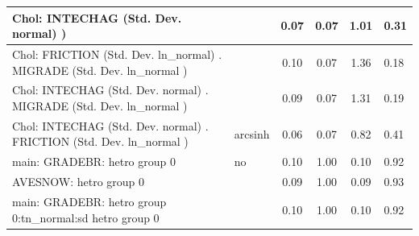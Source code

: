 \begin{table}
\begin{center}
\begin{tabular}{|l|l|c|c|c|l|}
			 Chol: INTECHAG (Std. Dev. normal) ) &  & 0.07 & 0.07 & 1.01 & 0.31 \\
			\hline
			 Chol: FRICTION (Std. Dev. ln_normal) . MIGRADE (Std. Dev.   ln_normal ) &  & 0.10 & 0.07 & 1.36 & 0.18 \\
			\hline
			 Chol: INTECHAG (Std. Dev. normal) . MIGRADE (Std. Dev.   ln_normal ) &  & 0.09 & 0.07 & 1.31 & 0.19 \\
			\hline
			 Chol: INTECHAG (Std. Dev. normal) . FRICTION (Std. Dev.   ln_normal ) & arcsinh & 0.06 & 0.07 & 0.82 & 0.41 \\
			\hline
			main: GRADEBR: hetro group 0 & no & 0.10 & 1.00 & 0.10 & 0.92 \\
			\hline
			AVESNOW: hetro group 0 &  & 0.09 & 1.00 & 0.09 & 0.93 \\
			\hline
			main: GRADEBR: hetro group 0:tn_normal:sd  hetro group 0 &  & 0.10 & 1.00 & 0.10 & 0.92 \\
			\hline
		\end{tabular}
	\end{center}
\end{table}